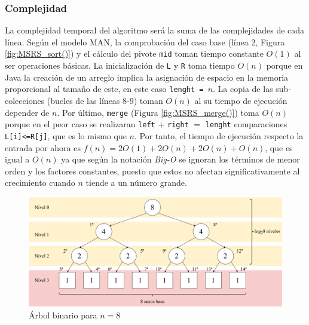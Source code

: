 \documentclass[titlepage]{article}
\begin{document}
\subsubsection{Complejidad}
La complejidad temporal del algoritmo será la suma de las complejidades de cada línea. Según el modelo MAN, la comprobación del caso base (línea 2, Figura \ref{fig:MSRS_sort()}) y el cálculo del pivote \lstinline{mid} toman tiempo constante \(O(1)\) al ser operaciones básicas. La inicialización de \lstinline{L} y \lstinline{R} toma tiempo \(O(n)\) porque en Java la creación de un arreglo implica la asignación de espacio en la memoria proporcional al tamaño de este, en este caso \lstinline{lenght = }\(n\). La copia de las sub-colecciones (bucles de las líneas 8-9) toman \(O(n)\) al su tiempo de ejecución depender de \(n\). Por último, \lstinline{merge} (Figura \ref{fig:MSRS_merge()}) toma \(O(n)\) porque en el peor caso se realizaran \lstinline{left} \(+\) \lstinline{right} \(=\) \lstinline{lenght} comparaciones \lstinline{L[i]<=R[j]}, que es lo mismo que \(n\). Por tanto, el tiempo de ejecución respecto la entrada por ahora es \(f(n) = 2O(1) + 2O(n) + 2O(n)+ O(n)\), que es igual a \(O(n)\) ya que según la notación \textit{Big-O} se ignoran los términos de menor orden y los factores constantes, puesto que estos no afectan significativamente al crecimiento cuando \(n\) tiende a un número grande.

\begin{figure}[hbtp]
    \centering
    \includegraphics[width=0.8\linewidth]{Diagrames/arbolBinarioMSRSn8.png}
    \caption{Árbol binario para \(n=8\)}
    \label{fig:arbol-MSRS-N=8}
\end{figure}
\end{document}
